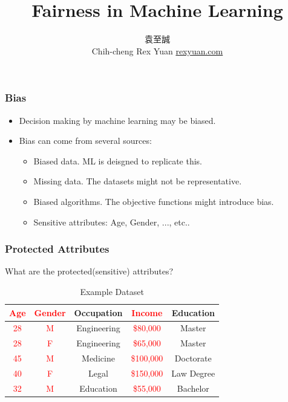 \documentclass{beamer}
\date{\displaydate{date}}
\title[Fairness]{Fairness in Machine Learning}
\author[Rex]{
    \begin{CJK}{UTF8}{bsmi}袁至誠\end{CJK}\newline
    Chih-cheng Rex Yuan\newline
    \href{https://rexyuan.com/}{rexyuan.com}
    }
\institute[IIS]{Institute of Information Science}
\newcommand{\red}[1]{\textcolor{red}{#1}}
\begin{document}
\begin{frame}
\titlepage
\end{frame}

\begin{frame}
    \frametitle{Bias}
    \begin{itemize}
        \item Decision making by machine learning may be biased.
        \item Bias can come from several sources:
        \begin{itemize}
            \item Biased data. ML is deisgned to replicate this.
            \item Missing data. The datasets might not be representative.
            \item Biased algorithms. The objective functions might introduce bias.
            \item Sensitive attributes: Age, Gender, ..., etc..
        \end{itemize}
    \end{itemize}
\end{frame}

\begin{frame}
    \frametitle{Protected Attributes}
    What are the protected(sensitive) attributes?
    \begin{table}
        \begin{tabular}{|c|c|c|c|c|}
            \hline
            \red{Age} & \red{Gender} & Occupation & \red{Income} & Education \\
            \hline
            \red{28} & \red{M} & Engineering & \red{\$80,000} & Master \\
            \red{28} & \red{F} & Engineering & \red{\$65,000} & Master \\
            \red{45} & \red{M} & Medicine    & \red{\$100,000} & Doctorate \\
            \red{40} & \red{F} & Legal       & \red{\$150,000} & Law Degree \\
            \red{32} & \red{M} & Education   & \red{\$55,000} & Bachelor \\
            \hline
        \end{tabular}
        \caption{Example Dataset}
    \end{table}
\end{frame}
\end{document}
